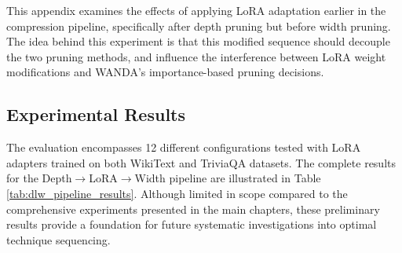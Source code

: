 This appendix examines the effects of applying LoRA adaptation earlier in the compression pipeline, specifically after depth pruning but before width pruning. The idea behind this experiment is that this modified sequence should decouple the two pruning methods, and influence the interference between LoRA weight modifications and WANDA's importance-based pruning decisions.

\subsection{Experimental Results}
The evaluation encompasses 12 different configurations tested with LoRA adapters trained on both WikiText and TriviaQA datasets. The complete results for the Depth$\rightarrow$LoRA$\rightarrow$Width pipeline are illustrated in Table \ref{tab:dlw_pipeline_results}. Although limited in scope compared to the comprehensive experiments presented in the main chapters, these preliminary results provide a foundation for future systematic investigations into optimal technique sequencing.

